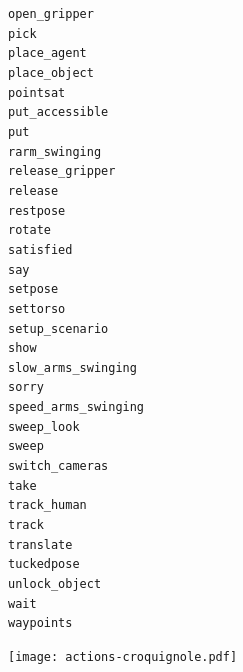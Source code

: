 \documentclass[compress]{beamer}
\begin{document}
{{{\begin{frame}{}
\begin{multicols}{4}
{\tt open\_gripper} \\
{\tt pick} \\
{\tt place\_agent} \\
{\tt place\_object} \\
{\tt pointsat} \\
{\tt put\_accessible} \\
{\tt put} \\
{\tt rarm\_swinging} \\
{\tt release\_gripper} \\
{\tt release} \\
{\tt restpose} \\
{\tt rotate} \\
{\tt satisfied} \\
{\tt say} \\
{\tt setpose} \\
{\tt settorso} \\
{\tt setup\_scenario} \\
{\tt show} \\
{\tt slow\_arms\_swinging} \\
{\tt sorry} \\
{\tt speed\_arms\_swinging} \\
{\tt sweep\_look} \\
{\tt sweep} \\
{\tt switch\_cameras} \\
{\tt take} \\
{\tt track\_human} \\
{\tt track} \\
{\tt translate} \\
{\tt tuckedpose} \\
{\tt unlock\_object} \\
{\tt wait} \\
{\tt waypoints} \\
    \end{multicols}
\end{frame}
}


{
\begin{frame}{}
    \centering
    \texttt{[image: actions-croquignole.pdf]}


\end{frame}}}}
\end{document}
